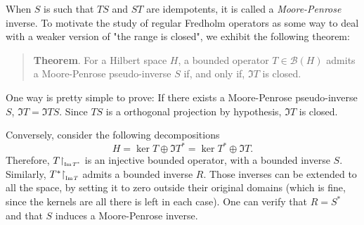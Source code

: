 \begin{observacao}
\label{exemplo: todo operador em esp hilb tem imagem fechada sse tem pseudo-inversa}
When $S$ is such that $TS$ and $ST$ are idempotents, it is called a \textit{Moore-Penrose} inverse. To motivate the study of regular Fredholm operators as some way to deal with a weaker version of "the range is closed", we exhibit the following theorem:
\begin{quote}
    \textbf{Theorem}. For a Hilbert space $H$, a bounded operator $T\in \mathscr B(H)$ admits a Moore-Penrose pseudo-inverse $S$ if, and only if, $\Im T$ is closed.
\end{quote}
One way is pretty simple to prove: If there exists a Moore-Penrose pseudo-inverse $S$, $\Im T = \Im TS$. Since $TS$ is a orthogonal projection by hypothesis, $\Im T$ is closed. 

Conversely, consider the following decompositions 
\begin{equation*}
    H = \ker T \oplus \Im T^* = \ker T^* \oplus \Im T.
\end{equation*}
Therefore, $T\sub\restrita{\Im T^*}$ is an injective bounded operator, with a bounded inverse $S$. Similarly, $T^*\sub\restrita{\Im T}$ admits a bounded inverse $R$. Those inverses can be extended to all the space, by setting it to zero outside their original domains (which is fine, since the kernels are all there is left in each case). One can verify that $R=S^*$ and that $S$ induces a Moore-Penrose inverse.
\end{observacao}


